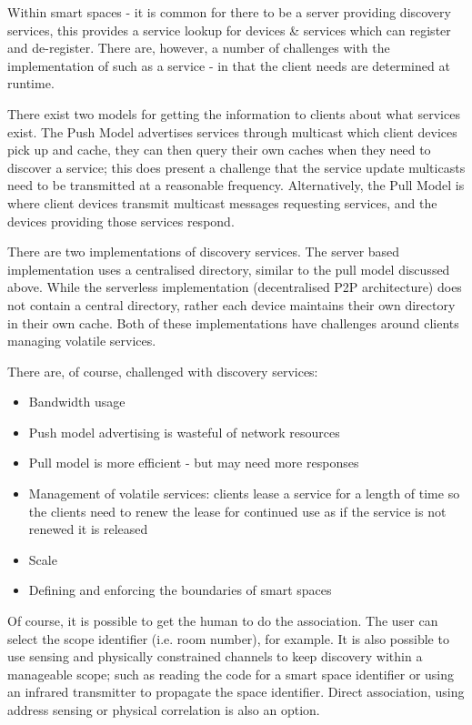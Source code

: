 Within smart spaces - it is common for there to be a server providing discovery services, this provides a service lookup for devices \& services which can register and de-register. There are, however, a number of challenges with the implementation of such as a service - in that the client needs are determined at runtime. 

There exist two models for getting the information to clients about what services exist. The Push Model advertises services through multicast which client devices pick up and cache, they can then query their own caches when they need to discover a service; this does present a challenge that the service update multicasts need to be transmitted at a reasonable frequency. Alternatively, the Pull Model is where client devices transmit multicast messages requesting services, and the devices providing those services respond. 

There are two implementations of discovery services. The server based implementation uses a centralised directory, similar to the pull model discussed above. While the serverless implementation (decentralised P2P architecture) does not contain a central directory, rather each device maintains their own directory in their own cache. Both of these implementations have challenges around clients managing volatile services.

There are, of course, challenged with discovery services:
\begin{itemize}
    \item Bandwidth usage
    \item Push model advertising is wasteful of network resources
    \item Pull model is more efficient - but may need more responses
    \item Management of volatile services: clients lease a service for a length of time so the clients need to renew the lease for continued use as if the service is not renewed it is released
    \item Scale
    \item Defining and enforcing the boundaries of smart spaces 
\end{itemize}

Of course, it is possible to get the human to do the association. The user can select the scope identifier (i.e. room number), for example. It is also possible to use sensing and physically constrained channels to keep discovery within a manageable scope; such as reading the code for a smart space identifier or using an infrared transmitter to propagate the space identifier. Direct association, using address sensing or physical correlation is also an option. 

